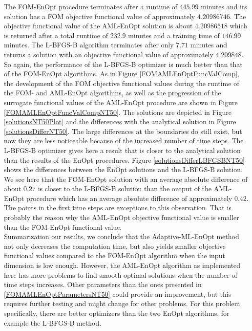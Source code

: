 The FOM-EnOpt procedure terminates after a runtime of $445.99$ minutes and its solution has a FOM objective functional value of approximately $4.20986746$. The objective functional value of the AML-EnOpt solution is about $4.20986518$ which is returned after a total runtime of $232.9$ minutes and a training time of $146.99$ minutes. The L-BFGS-B algorithm terminates after only $7.71$ minutes and returns a solution with an objective functional value of approximately $4.209848$. So again, the performance of the L-BFGS-B optimizer is much better than that of the FOM-EnOpt algorithms. As in Figure \ref{FOMAMLEnOptFuncValComp}, the development of the FOM objective functional values during the runtime of the FOM- and AML-EnOpt algorithms, as well as the progression of the surrogate functional values of the AML-EnOpt procedure are shown in Figure \ref{FOMAMLEnOptFuncValCompNT50}. The solutions are depicted in Figure \ref{solutionsNT50Plot} and the differences with the analytical solution in Figure \ref{solutionsDifferNT50}. The large differences at the boundaries do still exist, but now they are less noticeable because of the increased number of time steps. The L-BFGS-B optimizer gives here a result that is closer to the analytical solution than the results of the EnOpt procedures. Figure \ref{solutionsDifferLBFGSBNT50} shows the differences between the EnOpt solutions and the L-BFGS-B solution. We see here that the FOM-EnOpt solution with an average absolute difference of about $0.27$ is closer to the L-BFGS-B solution than the output of the AML-EnOpt procedure which has an average absolute difference of approximately $0.42$. The points in the first time steps are exceptions to this observation. That is probably the reason why the AML-EnOpt objective functional value is smaller than the FOM-EnOpt functional value.\\

Summarization our results, we conclude that the Adaptive-ML-EnOpt method not only decreases the computation time, but also yields smaller objective functional values compared to the FOM-EnOpt algorithm when the input dimension is low enough. However, the AML-EnOpt algorithm as implemented here has more problems to find smooth optimal solutions when the number of time steps increases. Other parameters than the ones presented in \ref{FOMAMLEnOptParametersNT50} could provide an improvement, but this requires further testing and might change for other problems. For this problem specifically, there are better optimizers than the two EnOpt algorithms, for example the L-BFGS-B method.

